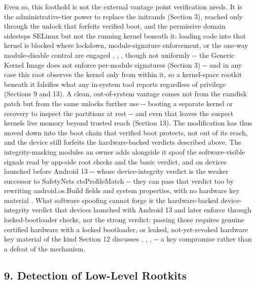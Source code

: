 \documentclass[
]{article}
\begin{document}
Even so, this foothold is not the external vantage point verification
needs. It is the administrative-tier power to replace the initramfs
(Section 3), reached only through the unlock that forfeits verified
boot, and the permissive domain sidesteps SELinux but not the running
kernel beneath it: loading code into that kernel is blocked where
lockdown, module-signature enforcement, or the one-way module-disable
control are engaged \citep{kernel-lockdown},
\citep{kernel-module-signing}, \citep{kernel-modules-disabled}, though
not uniformly -\/- the Generic Kernel Image does not enforce per-module
signatures (Section 3) -\/- and in any case this root observes the
kernel only from within it, so a kernel-space rootkit beneath it
falsifies what any in-system tool reports regardless of privilege
(Sections 9 and 13). A clean, out-of-system vantage comes not from the
ramdisk patch but from the same unlock\textquotesingle s further use
-\/- booting a separate kernel or recovery to inspect the partitions at
rest -\/- and even that leaves the suspect kernel\textquotesingle s live
memory beyond trusted reach (Section 13). The modification has thus
moved down into the boot chain that verified boot protects, not out of
its reach, and the device still forfeits the hardware-backed verdicts
described above. The integrity-masking modules an owner adds alongside
it spoof the software-visible signals read by app-side root checks and
the basic verdict, and on devices launched before Android 13 -\/- whose
device-integrity verdict is the weaker successor to
SafetyNet\textquotesingle s ctsProfileMatch -\/- they can pass that
verdict too by rewriting android.os.Build fields and system properties,
with no hardware key material \citep{playintegrityfork}. What software
spoofing cannot forge is the hardware-backed device-integrity verdict
that devices launched with Android 13 and later enforce through
locked-bootloader checks, nor the strong verdict: passing those requires
genuine certified hardware with a locked bootloader, or leaked,
not-yet-revoked hardware key material of the kind Section 12 discusses
\citep{play-integrity-verdicts}, \citep{play-integrity-improvements},
\citep{grapheneos-attestation-compat}, \citep{playintegrityfork} -\/- a
key compromise rather than a defeat of the mechanism.

\subsection{9. Detection of Low-Level
Rootkits}\label{detection-of-low-level-rootkits}
\end{document}
